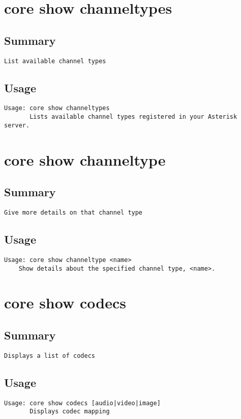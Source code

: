 \section{core show channeltypes}
\subsection{Summary}
\begin{verbatim}
List available channel types
\end{verbatim}
\subsection{Usage}
\begin{verbatim}
Usage: core show channeltypes
       Lists available channel types registered in your Asterisk server.

\end{verbatim}


\section{core show channeltype}
\subsection{Summary}
\begin{verbatim}
Give more details on that channel type
\end{verbatim}
\subsection{Usage}
\begin{verbatim}
Usage: core show channeltype <name>
	Show details about the specified channel type, <name>.

\end{verbatim}


\section{core show codecs}
\subsection{Summary}
\begin{verbatim}
Displays a list of codecs
\end{verbatim}
\subsection{Usage}
\begin{verbatim}
Usage: core show codecs [audio|video|image]
       Displays codec mapping

\end{verbatim}


